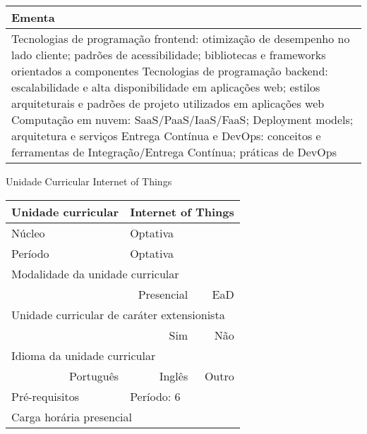 \begin{quadro}[ht!]
\begin{tabular}{|p{3cm} p{2cm} p{3cm} p{2cm} p{3cm} p{2cm}|}
\multicolumn{6}{|p{15cm}|}{\cellcolor{blue1} Ementa} \\\hline
\hline\multicolumn{6}{|p{15cm}|}{\scriptsize Tecnologias de programação frontend: otimização de desempenho no lado cliente; padrões de acessibilidade; bibliotecas e frameworks orientados a componentes Tecnologias de programação backend: escalabilidade e alta disponibilidade em aplicações web; estilos arquiteturais e padrões de projeto utilizados em aplicações web Computação em nuvem: SaaS/PaaS/IaaS/FaaS; Deployment models; arquitetura e serviços Entrega Contínua e DevOps: conceitos e ferramentas de Integração/Entrega Contínua; práticas de DevOps}\\\hline
\hline
	\end{tabular}
\end{quadro}
\begin{quadro}[ht!]
  \centering\scriptsize
\caption{Unidade Curricular Internet of Things}
\label{ unit_53 }
\begin{tabular}{|p{3cm} p{2cm} p{3cm} p{2cm} p{3cm} p{2cm}|}\hline
\multicolumn{1}{|p{3cm}|}{\cellcolor{blue1} Unidade curricular} & \multicolumn{5}{p{9cm}|}{ Internet of Things }\\\hline
\multicolumn{1}{|p{3cm}|}{\cellcolor{blue1} Núcleo} & \multicolumn{5}{p{11.5cm}|}{ Optativa }\\\hline
\multicolumn{1}{|p{3cm}|}{\cellcolor{blue1} Período} & \multicolumn{5}{p{9cm}|}{ Optativa }\\\hline
\multicolumn{6}{|p{15cm}|}{\cellcolor{blue1} Modalidade da unidade curricular} \\\hline
\multicolumn{2}{|r}{		} &  \multicolumn{2}{r}{Presencial \Square } & \multicolumn{2}{r|}{EaD \XBox	} \\\hline
\multicolumn{6}{|p{15cm}|}{\cellcolor{blue1} Unidade curricular de caráter extensionista} \\\hline
\multicolumn{4}{|r}{			Sim \Square	} & \multicolumn{2}{r|}{	Não \XBox	}\\\hline
\multicolumn{6}{|p{15cm}|}{\cellcolor{blue1} Idioma da unidade curricular} \\ \hline
\multicolumn{2}{|r}{	Português \XBox	} &  \multicolumn{2}{r}{	Inglês \Square	} & \multicolumn{2}{r|}{	Outro \Square	} \\ \hline
\multicolumn{1}{|p{3cm}|}{\cellcolor{blue1} Pré-requisitos} & \multicolumn{5}{p{9cm}|}{ Período: 6 }\\ \hline
\multicolumn{6}{|p{15cm}|}{\cellcolor{blue1} Carga horária presencial} \\ \hline

\end{tabular}
\end{quadro}
